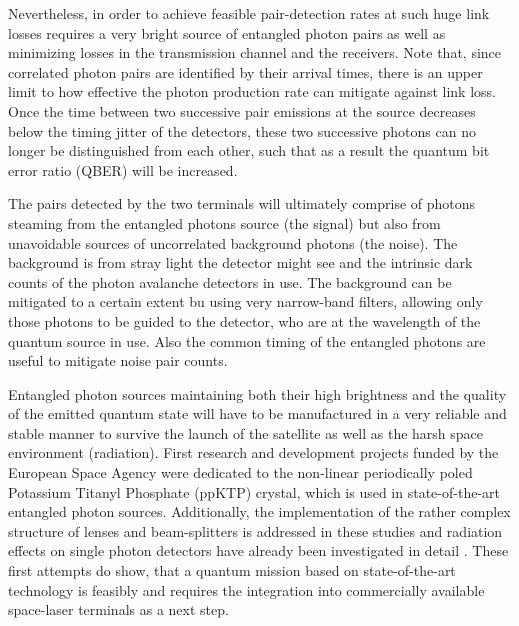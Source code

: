 \documentclass{article}
\begin{document}
Nevertheless, in order to achieve feasible pair-detection rates at such huge link losses requires a very bright source of entangled photon pairs as well as minimizing losses in the transmission channel and the receivers. Note that, since correlated photon pairs are identified by their arrival times, there is an upper limit to how effective the photon production rate can mitigate against link loss. Once the time between two successive pair emissions at the source decreases below the timing jitter of the detectors, these two successive photons can no longer be distinguished from each other, such that as a result the quantum bit error ratio (QBER) will be increased. 

The pairs detected by the two terminals will ultimately comprise of photons steaming from the entangled photons source (the signal) but also from unavoidable sources of uncorrelated background photons (the noise). The background is from stray light the detector might see and the intrinsic dark counts of the photon avalanche detectors in use. The background can be mitigated to a certain extent bu using very narrow-band filters, allowing only those photons to be guided to the detector, who are at the wavelength of the quantum source in use. Also the common timing of the entangled photons are useful to mitigate noise pair counts.

Entangled photon sources maintaining both their high brightness and the quality of the emitted quantum state will have to be manufactured in a very reliable and stable manner to survive the launch of the satellite as well as the harsh space environment (radiation). First research and development projects funded by the European Space Agency were dedicated to the non-linear periodically poled Potassium Titanyl Phosphate (ppKTP) crystal, which is used in state-of-the-art entangled photon sources. Additionally, the implementation of the rather complex structure of lenses and beam-splitters is addressed in these studies and radiation effects on single photon detectors have already been investigated in detail \cite{kaiser20081}. These first attempts do show, that a quantum mission based on state-of-the-art technology is feasibly and requires the integration into commercially available space-laser terminals as a next step. 
\end{document}
